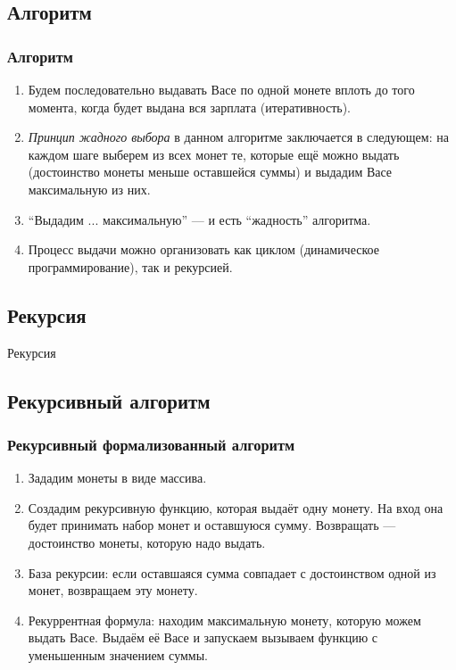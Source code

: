 \documentclass[compress,red]{beamer}
\begin{document}
\subsection{Алгоритм}
\begin{frame}[fragile]
\frametitle{Алгоритм}
	\begin{enumerate}
		\item Будем последовательно выдавать Васе по одной монете вплоть до того момента, когда будет выдана вся зарплата (итеративность).
		\item \emph{Принцип жадного выбора} в данном алгоритме заключается в следующем: на каждом шаге выберем из всех монет те, которые ещё можно выдать (достоинство монеты меньше оставшейся суммы) и выдадим Васе максимальную из них.
		\item ``Выдадим ... максимальную'' --- и есть ``жадность'' алгоритма.
		\item Процесс выдачи можно организовать как циклом (динамическое программирование), так и рекурсией.
	\end{enumerate}
\end{frame}

\subsection{Рекурсия}
\begin{frame}
	\begin{center}
	\Huge{Рекурсия}
	\end{center}
\end{frame}

\subsection{Рекурсивный алгоритм}
\begin{frame}[fragile]
  \frametitle{Рекурсивный формализованный алгоритм}
	\begin{enumerate}
		\item Зададим монеты в виде массива.
		\item Создадим рекурсивную функцию, которая выдаёт одну монету. На вход она будет принимать набор монет и оставшуюся сумму. Возвращать --- достоинство монеты, которую надо выдать. 
		\item База рекурсии: если оставшаяся сумма совпадает с достоинством одной из монет, возвращаем эту монету.
		\item Рекуррентная формула: находим максимальную монету, которую можем выдать Васе. Выдаём её Васе и запускаем вызываем функцию с уменьшенным значением суммы.
	\end{enumerate}
\end{frame}
\end{document}
